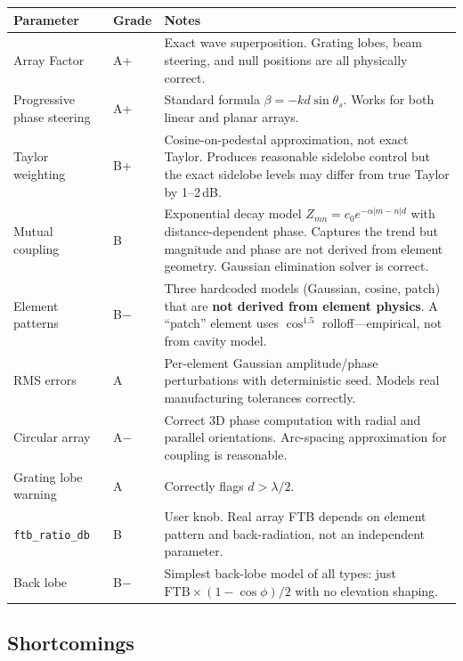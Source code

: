 \documentclass[11pt,a4paper]{article}
\begin{document}
\begin{longtable}{@{}llp{6cm}@{}}
\toprule
\textbf{Parameter} & \textbf{Grade} & \textbf{Notes} \\
\midrule
\endhead
Array Factor & A+ & Exact wave superposition. Grating lobes, beam steering, and null positions are all physically correct. \\
Progressive phase steering & A+ & Standard formula $\beta = -kd\sin\theta_s$. Works for both linear and planar arrays. \\
Taylor weighting & B+ & Cosine-on-pedestal approximation, not exact Taylor. Produces reasonable sidelobe control but the exact sidelobe levels may differ from true Taylor by 1--2\,dB. \\
Mutual coupling & B & Exponential decay model $Z_{mn} = c_0 e^{-\alpha |m-n| d}$ with distance-dependent phase. Captures the trend but magnitude and phase are not derived from element geometry. Gaussian elimination solver is correct. \\
Element patterns & B$-$ & Three hardcoded models (Gaussian, cosine, patch) that are \textbf{not derived from element physics}. A ``patch'' element uses $\cos^{1.5}$ rolloff---empirical, not from cavity model. \\
RMS errors & A & Per-element Gaussian amplitude/phase perturbations with deterministic seed. Models real manufacturing tolerances correctly. \\
Circular array & A$-$ & Correct 3D phase computation with radial and parallel orientations. Arc-spacing approximation for coupling is reasonable. \\
Grating lobe warning & A & Correctly flags $d > \lambda/2$. \\
\texttt{ftb\_ratio\_db} & B & User knob. Real array FTB depends on element pattern and back-radiation, not an independent parameter. \\
Back lobe & B$-$ & Simplest back-lobe model of all types: just $\text{FTB} \times (1-\cos\phi)/2$ with no elevation shaping. \\
\bottomrule
\end{longtable}

\subsection{Shortcomings}
\end{document}
